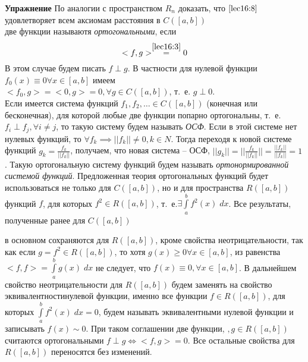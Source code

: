 \documentclass[../../main.tex]{subfiles}
\begin{document}
	\textbf{Упражнение} По аналогии с пространством $R_n$ доказать, что
	 $\eqref{lec16:8}$ удовлетворяет всем аксиомам расстояния в $C(\left[a, 
	 b\right])$\\
	две функции называютя \emph{ортогональными}, если
	\begin{equation} 
	\label{lec16:9}
	<f, g> \stackrel{\eqref{lec16:3}}{=} 0
	\end{equation}
	 В этом случае будем писать $f \perp g$. В частности для нулевой функции 
	 $f_0(x)
	  \equiv 0 \forall x \in \left[a, b\right]$ имеем\\
	 $<f_0, g> = <0, g> = 0, \forall g \in C(\left[a, b\right])$, т.~е. $g\perp 
	 0$.\\
	 Если имеется система функций $f_1, f_2, \ldots \in  C(\left[a, b\right]) $
	  (конечная или бесконечная), для которой любые две функции попарно 
	  ортогональны,
	   т.~е. $f_i \perp f_j, \forall i \neq j$, то такую систему будем называть 
	   \emph{ОСФ}.
	    Если в этой системе нет нулевых функций, то $\forall f_k \implies ||f_k||
	     \neq 0, k \in N $. Тогда переходя к новой системе функций $g_k =
	      \frac{f_k}{||f_k||}$, получаем, что новая система \--- ОСФ, $||g_k|| =
	       ||\frac{f_k}{||f_k||}|| = \frac{||f_k||}{||f_k||} = 1$. Такую 
	       ортогональную
	        систему функций будем называть \emph{ортонормированной системой 
	        функций}.
	 Предложенная теория ортогональных функций будет использоваться не только для
	  $C(\left[a, b\right])$, но и для пространства $R(\left[a, b\right])$ 
	  функций $f$,
	  	   для которых $f^2 \in R(\left[a, b\right])$, т.~е.$\exists 
	  	   \int\limits_a^b
   		f^2(x)\; dx$. Все результаты, полученные ранее для $C(\left[a, b\right])$ 
   		
   		в
	    основном сохраняются для $R(\left[a, b\right])$, кроме свойства
	     неотрицательности, так как  если $g = f^2 \in R(\left[a, b\right])$, то 
	     хотя
	     $g(x) \ge 0 \forall x \in \left[a, b\right]$, из равенства $<f,f> =
	     \int\limits_a^b g(x)\; dx$ не следует, что $f(x) \equiv 0, \forall x \in
      \left[a, b\right]$. В дальнейшем свойство неотрицательности для 
      $R(\left[a,
      b\right])$ будем заменять на свойство эквивалентностинулевой функции,   
      именно
       все функции $f \in R(\left[a, b\right])$, для которых
      $\int\limits_a^b f^2(x)\; dx = 0$, будем называть эквивалентными нулевой
      функции и записывать $f(x) \sim 0$. При таком соглашении две функции, $,
	            g \in R(\left[a, b\right])$ считаются ортогональными $f \perp g
	             \iff <f, g> = 0$. Все остальные свойства для $R(\left[a,
	              b\right])$ переносятся без изменений.
\end{document}
